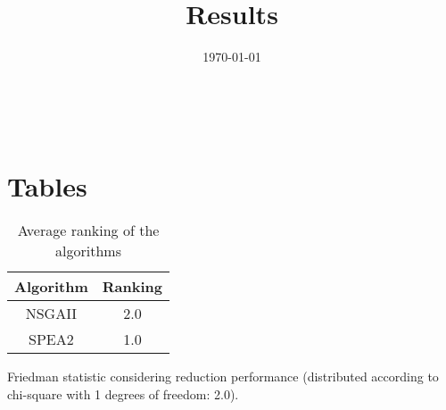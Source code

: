 \documentclass{article}
\title{Results}
\author{}
\date{\today}
\begin{document}
\oddsidemargin 0in \topmargin 0in\maketitle
\
\section{Tables}
\begin{table}[!htp]
\centering
\caption{Average ranking of the algorithms}
\begin{tabular}{c|c}
Algorithm&Ranking\\
\hline
NSGAII&2.0\\
SPEA2&1.0\\
\end{tabular}
\end{table}


Friedman statistic considering reduction performance (distributed according to chi-square with 1 degrees of freedom: 2.0).
\end{document}

